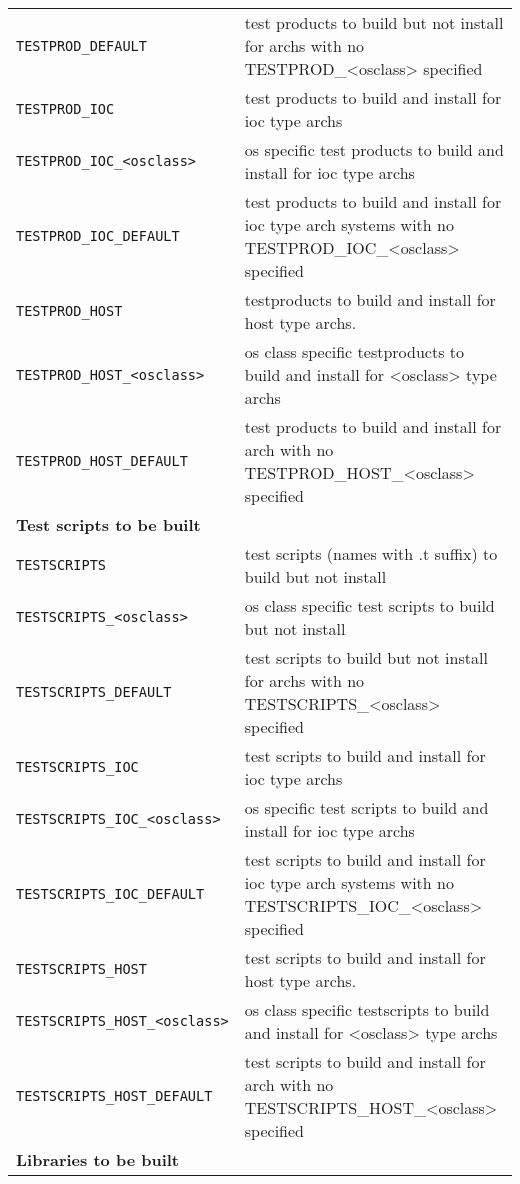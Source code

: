 \begin{center}
\begin{longtable}{p{2.94784in}p{3.76247in}}
\verb|TESTPROD_DEFAULT| & test products to build but not install for archs with no TESTPROD\_\textless{}osclass\textgreater{} specified\\
\verb|TESTPROD_IOC| & test products to build and install for ioc type archs\\
\verb|TESTPROD_IOC_<osclass>| & os specific test products to build and install for ioc type archs\\
\verb|TESTPROD_IOC_DEFAULT| & test products to build and install for ioc type arch systems with no TESTPROD\_IOC\_\textless{}osclass\textgreater{} specified\\
\verb|TESTPROD_HOST| & testproducts to build and install for host type archs. \\
\verb|TESTPROD_HOST_<osclass>| & os class specific testproducts to build and install for \textless{}osclass\textgreater{} type archs\\
\verb|TESTPROD_HOST_DEFAULT| & test products to build and install for arch with no TESTPROD\_HOST\_\textless{}osclass\textgreater{} specified\\
\textbf{Test scripts to be built} & \\
\verb|TESTSCRIPTS| & test scripts (names with .t suffix) to build but not install\\
\verb|TESTSCRIPTS_<osclass>| & os class specific test scripts to build but not install\\
\verb|TESTSCRIPTS_DEFAULT| & test scripts to build but not install for archs with no TESTSCRIPTS\_\textless{}osclass\textgreater{} specified\\
\verb|TESTSCRIPTS_IOC| & test scripts to build and install for ioc type archs\\
\verb|TESTSCRIPTS_IOC_<osclass>| & os specific test scripts to build and install for ioc type archs\\
\verb|TESTSCRIPTS_IOC_DEFAULT| & test scripts to build and install for ioc type arch systems with no TESTSCRIPTS\_IOC\_\textless{}osclass\textgreater{} specified\\
\verb|TESTSCRIPTS_HOST| & test scripts to build and install for host type archs. \\
\verb|TESTSCRIPTS_HOST_<osclass>| & os class specific testscripts to build and install for \textless{}osclass\textgreater{} type archs\\
\verb|TESTSCRIPTS_HOST_DEFAULT| & test scripts to build and install for arch with no TESTSCRIPTS\_HOST\_\textless{}osclass\textgreater{} specified\\
\textbf{Libraries to be built} & \\

\end{longtable}
\end{center}
